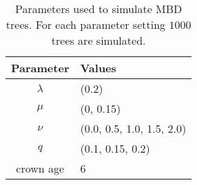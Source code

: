 \begin{table}[ht]
  \centering
  \begin{tabular}{ | c | l | }
    \hline
    \textbf{Parameter} &
    \textbf{Values} \\ 
    \hline
    $\lambda$ & (0.2) \\
    $\mu$ & (0, 0.15) \\
    $\nu$ & (0.0, 0.5, 1.0, 1.5, 2.0) \\
    $q$ & (0.1, 0.15, 0.2) \\
    crown age & 6 \\
    \hline
  \end{tabular}
  \caption{
    Parameters used to simulate MBD trees. For each parameter setting $1000$ trees are simulated.
  }
  \label{tab:simulation_parameters}
\end{table}